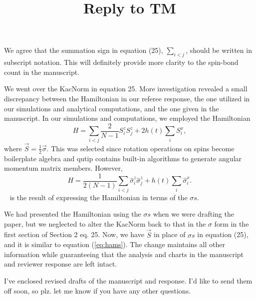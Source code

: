 \documentclass[10pt]{article}
\title{Reply to TM}
\begin{document}
\maketitle
We agree that the summation sign in equation (25), $\sum_{i<j}$, should be written in subscript notation. This will definitely provide more clarity to the spin-bond count in the manuscript.

We went over the KacNorm in equation 25. More investigation revealed a small discrepancy between the Hamiltonian in our referee response, the one utilized in our simulations and analytical computations, and the one given in the manuscript. In our simulations and computations, we employed the Hamiltonian 
\begin{equation}
	H = \sum_{i<j} \frac{2}{N-1} S^z_i S^z_j + 2h(t) \sum_i S^x_i, \label{eq:hams} 
\end{equation}
where $\vec{S}=\frac12\vec{\sigma}$. This was selected since rotation operations on spins become boilerplate algebra and qutip contains built-in algorithms to generate angular momentum matrix members. However, 
\begin{equation} 
	H = \frac{1}{2(N-1)} \sum_{i<j} \hat{\sigma}^z_i \hat{\sigma}^z_j + h(t) \sum_i \hat{\sigma}^x_i. \label{eq:hamh} 
\end{equation} 
is the result of expressing the Hamiltonian in terms of the $\sigma s$.

We had presented the Hamiltonian using the $\sigma s$ when we were drafting the paper, but we neglected to alter the KacNorm back to that in the $\sigma$ form in the first section of Section 2 eq. 25. Now, we have $\vec{S}$ in place of $\sigma s$ in equation (25), and it is similar to equation (\eqref{eq:hams}). The change maintains all other information while guaranteeing that the analysis and charts in the manuscript and reviewer response are left intact.

\noindent I've enclosed revised drafts of the manuscript and response. I'd like to send them off soon, so plz. let me know if you have any other questions.
\end{document}
